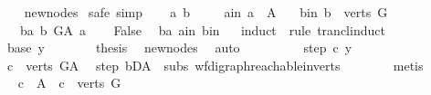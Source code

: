 \begin{isabellebody}
%
\isadelimproof
\ \ %
\endisadelimproof
%
\isatagproof
{}\isamarkupfalse%
\ new{\isacharunderscore}{\kern0pt}nodes\ \isanewline
{}\isamarkupfalse%
{\isacharparenleft}{\kern0pt}safe{\isacharcomma}{\kern0pt}\ simp{\isacharparenright}{\kern0pt}\isanewline
\ \ \isamarkupfalse%
\ a\ b\ \isanewline
\ \ \isamarkupfalse%
\ a{\isacharunderscore}{\kern0pt}in{\isacharcolon}{\kern0pt}\ {\isachardoublequoteopen}a\ {\isasymin}\ A{\isachardoublequoteclose}\isanewline
\ \ \ b{\isacharunderscore}{\kern0pt}in{\isacharcolon}{\kern0pt}\ {\isachardoublequoteopen}b\ {\isasymin}\ verts\ G{\isachardoublequoteclose}\isanewline
\ \ \ ba{\isacharcolon}{\kern0pt}\ {\isachardoublequoteopen}b\ {\isasymrightarrow}\isactrlsup {\isacharplus}{\kern0pt}\isactrlbsub G{\isacharunderscore}{\kern0pt}A\isactrlesub \ a{\isachardoublequoteclose}\isanewline
\ \ \isamarkupfalse%
\ False\ \isamarkupfalse%
\ ba\ a{\isacharunderscore}{\kern0pt}in\ b{\isacharunderscore}{\kern0pt}in\isanewline
\ \ \isamarkupfalse%
{\isacharparenleft}{\kern0pt}induct\ \ rule{\isacharcolon}{\kern0pt}\ trancl{\isacharunderscore}{\kern0pt}induct{\isacharparenright}{\kern0pt}\isanewline
\ \ \ \ \isamarkupfalse%
\ {\isacharparenleft}{\kern0pt}base\ y{\isacharparenright}{\kern0pt}\isanewline
\ \ \ \ \isamarkupfalse%
\ \isamarkupfalse%
\ {\isacharquery}{\kern0pt}thesis\ \isamarkupfalse%
\ new{\isacharunderscore}{\kern0pt}nodes\ \isamarkupfalse%
\ auto\ \isanewline
\ \ \isamarkupfalse%
\isanewline
\ \ \ \ \isamarkupfalse%
\ {\isacharparenleft}{\kern0pt}step\ c\ y{\isacharparenright}{\kern0pt}\isanewline
\ \ \ \ \isamarkupfalse%
\ {\isachardoublequoteopen}c\ {\isasymin}\ verts\ G{\isacharunderscore}{\kern0pt}A{\isachardoublequoteclose}\ \isamarkupfalse%
\ step{\isacharparenleft}{\kern0pt}{}{\isacharparenright}{\kern0pt}\ bD{\isacharunderscore}{\kern0pt}A\ \ subs{\isacharparenleft}{\kern0pt}{}{\isacharparenright}{\kern0pt}\ wf{\isacharunderscore}{\kern0pt}digraph{\isachardot}{\kern0pt}reachable{}{\isacharunderscore}{\kern0pt}in{\isacharunderscore}{\kern0pt}verts{\isacharparenleft}{\kern0pt}{}{\isacharparenright}{\kern0pt}\isanewline
\ \ \ \ \ \ \isamarkupfalse%
\ metis\isanewline
\ \ \ \ \isamarkupfalse%
\ \isamarkupfalse%
\ {\isachardoublequoteopen}c\ {\isasymin}\ A{\isachardoublequoteclose}\ {\isacharbar}{\kern0pt}\ {\isachardoublequoteopen}c\ {\isasymin}\ verts\ G{\isachardoublequoteclose}\ \isamarkupfalse%

\end{isabellebody}
